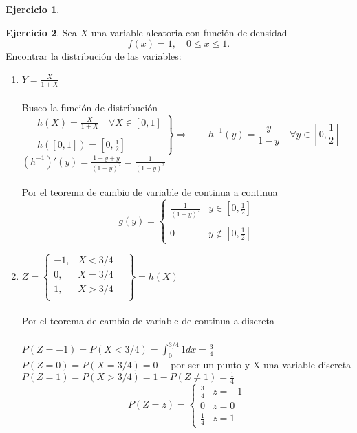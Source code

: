 \documentclass[a4paper, 12pt]{article}
\theoremstyle{definition}
\newtheorem{ej}{Ejercicio}
\begin{document}
\begin{ej}
	
\end{ej}

\begin{ej}
	Sea $X$ una variable aleatoria con función de densidad
	\[f(x) = 1, \quad 0\leq x \leq 1.\]
	Encontrar la distribución de las variables:
	\begin{enumerate}[label=\textit{\alph*)}]
		\item $Y = \frac{X}{1+X}$ \\
		\\
		Busco la función de distribución
		\[\left. \begin{array}{c}
		h(X) = \frac{X}{1+X} \quad \forall X\in [0,1] \\
		\\
		h([0,1]) = \left[0, \frac{1}{2}\right] 
		\end{array} \right\} \Longrightarrow \qquad h^{-1}(y) =\frac{y}{1-y}\quad\forall y\in \left[0, \frac{1}{2}\right]\]
		\(\left(h^{-1}\right)'(y) =  \frac{1-y+y}{(1-y)^2} = \frac{1}{(1-y)^2}\) \\
		\\
		Por el teorema de cambio de variable de continua a continua
		\[g(y) = \left\{\begin{array}{cc}
		\frac{1}{(1-y)^2} & y \in \left[0, \frac{1}{2}\right] \\
		& \\
		0 & y \notin \left[0, \frac{1}{2}\right]
		\end{array}\right.\]
		
		\item $Z = \left\{\begin{array}{cc}
		-1, & X<3/4 \\
		0, & X=3/4 \\
		1, & X>3/4 \\
		\end{array} \quad\right\} = h(X)$ \\
		\\
		Por el teorema de cambio de variable de continua a discreta \\
		\\
		\(P(Z=-1) = P(X<3/4) = \int^{3/4}_0 1 dx = \frac{3}{4}\) \\
		\(P(Z=0) = P(X=3/4) = 0 \quad\) por ser un punto y X una variable discreta \\
		\(P(Z=1) = P(X>3/4) = 1-P(Z \neq 1) = \frac{1}{4}\)
		\[P(Z=z) = \left\{\begin{array}{cc}
		\frac{3}{4} & z = -1 \\
		0 & z = 0 \\
		\frac{1}{4} & z = 1
		\end{array}\right.\]
	\end{enumerate}
\end{ej}
\end{document}
